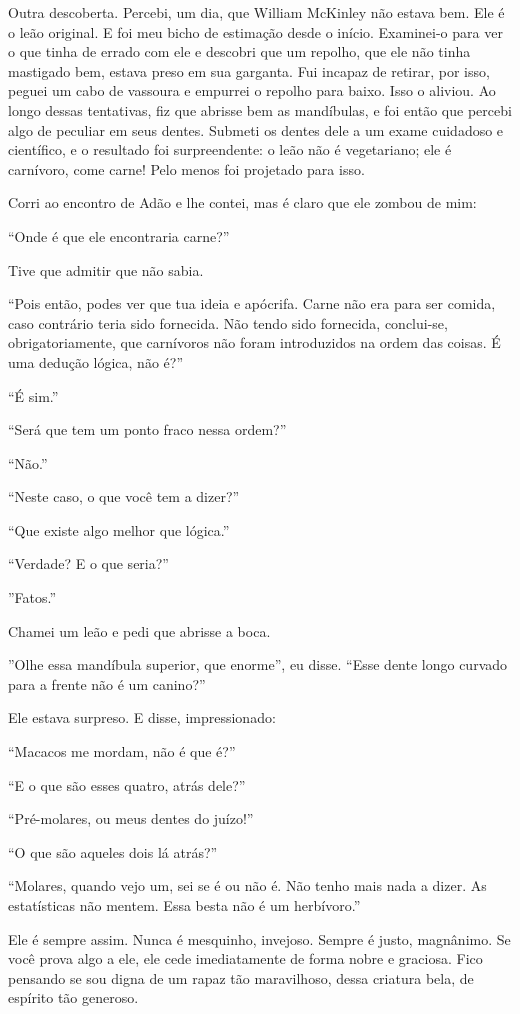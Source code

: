  Outra descoberta. Percebi, um dia, que William McKinley não estava bem. Ele
é o leão original. E foi meu bicho de estimação desde o início. Examinei-o para
ver o que tinha de errado com ele e descobri que um repolho, que ele não tinha
mastigado bem, estava preso em sua garganta. Fui incapaz de retirar, por isso, peguei um
cabo de vassoura e empurrei o repolho para baixo. Isso o aliviou. Ao longo
dessas tentativas, fiz que abrisse bem as mandíbulas, e foi então que percebi
algo de peculiar em seus dentes. Submeti os dentes dele a um exame cuidadoso e
científico, e o resultado foi surpreendente: o leão não é vegetariano; ele é
carnívoro, come carne! Pelo menos foi projetado para isso.

Corri ao encontro de Adão e lhe contei, mas é claro que ele zombou de mim:

“Onde é que ele encontraria carne?”

Tive que admitir que não sabia.

“Pois então, podes ver que tua ideia e apócrifa. Carne não era para ser
comida, caso contrário teria sido fornecida. Não tendo sido fornecida,
conclui-se, obrigatoriamente, que carnívoros não foram introduzidos na ordem das
coisas. É uma dedução lógica, não é?”

“É sim.”

“Será que tem um ponto fraco nessa ordem?”

“Não.”

“Neste caso, o que você tem a dizer?”

“Que existe algo melhor que lógica.”

“Verdade? E o que seria?”

”Fatos.”

Chamei um leão e pedi que abrisse a boca.

”Olhe essa mandíbula superior, que enorme”, eu disse. “Esse dente longo curvado
para a frente não é um canino?”

Ele estava surpreso. E disse, impressionado:

“Macacos me mordam, não é que é?”

“E o que são esses quatro, atrás dele?”

“Pré-molares, ou meus dentes do juízo!”

“O que são aqueles dois lá atrás?”

“Molares, quando vejo um, sei se é ou não é. Não tenho mais nada a dizer. As
estatísticas não mentem. Essa besta não é um herbívoro.”

Ele é sempre assim. Nunca é mesquinho, invejoso. Sempre é justo, magnânimo. Se você
prova algo a ele, ele cede imediatamente de forma nobre e graciosa. Fico pensando se
sou digna de um rapaz tão maravilhoso, dessa criatura bela, de espírito tão
generoso.

